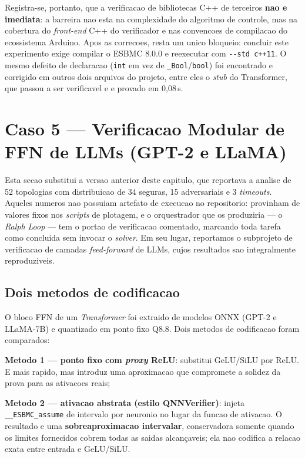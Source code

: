 Registra-se, portanto, que a verificacao de bibliotecas C++ de terceiros \textbf{nao e imediata}: a barreira nao esta na complexidade do algoritmo de controle, mas na cobertura do \textit{front-end} C++ do verificador e nas convencoes de compilacao do ecossistema Arduino. Apos as correcoes, resta um unico bloqueio: concluir este experimento exige compilar o ESBMC 8.0.0 e reexecutar com \texttt{-{}-std c++11}. O mesmo defeito de declaracao (\texttt{int} em vez de \texttt{\_Bool}/\texttt{bool}) foi encontrado e corrigido em outros dois arquivos do projeto, entre eles o \textit{stub} do Transformer, que passou a ser verificavel e e provado em 0,08\,s.


\section{Caso 5 --- Verificacao Modular de FFN de LLMs (GPT-2 e LLaMA)}

Esta secao substitui a versao anterior deste capitulo, que reportava a analise de
52 topologias com distribuicao de 34 seguras, 15 adversariais e 3 \textit{timeouts}.
Aqueles numeros nao possuiam artefato de execucao no repositorio: provinham de
valores fixos nos \textit{scripts} de plotagem, e o orquestrador que os produziria
--- o \textit{Ralph Loop} --- tem o portao de verificacao comentado, marcando toda
tarefa como concluida sem invocar o \textit{solver}. Em seu lugar, reportamos o
subprojeto de verificacao de camadas \textit{feed-forward} de LLMs, cujos
resultados sao integralmente reproduziveis.

\subsection{Dois metodos de codificacao}

O bloco FFN de um \textit{Transformer} foi extraido de modelos ONNX (GPT-2 e
LLaMA-7B) e quantizado em ponto fixo Q8.8. Dois metodos de codificacao foram
comparados:

\begin{alineas}
    \item \textbf{Metodo 1 --- ponto fixo com \textit{proxy} ReLU}: substitui
    GeLU/SiLU por ReLU. E mais rapido, mas introduz uma aproximacao que compromete
    a solidez da prova para as ativacoes reais;
    \item \textbf{Metodo 2 --- ativacao abstrata (estilo QNNVerifier)}: injeta
    \texttt{\_\_ESBMC\_assume} de intervalo por neuronio no lugar da funcao de
    ativacao. O resultado e uma \textbf{sobreaproximacao intervalar}, conservadora
    somente quando os limites fornecidos cobrem todas as saidas alcançaveis; ela
    nao codifica a relacao exata entre entrada e GeLU/SiLU.
\end{alineas}

